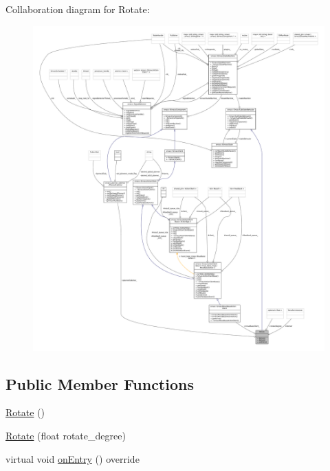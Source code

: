 Collaboration diagram for Rotate\+:
\nopagebreak
\begin{figure}[H]
\begin{center}
\leavevmode
\includegraphics[width=350pt]{classRotate__coll__graph}
\end{center}
\end{figure}
\subsection*{Public Member Functions}
\begin{DoxyCompactItemize}
\item 
\hyperlink{classRotate_a36c4a94d1c5a6306ce443c3f6c546e13}{Rotate} ()
\item 
\hyperlink{classRotate_ad8334e945e878a7e7f9dd4521c6a9573}{Rotate} (float rotate\+\_\+degree)
\item 
virtual void \hyperlink{classRotate_ab07f79966ab172e454139c4139adf51b}{on\+Entry} () override
\end{DoxyCompactItemize}
